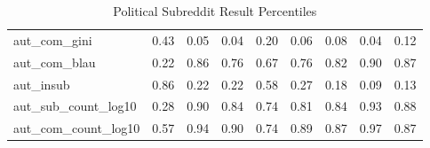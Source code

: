 \begin{table}
\begin{tabular}{lrrrrrrrr}
aut\_com\_gini        &        0.43 &         0.05 &          0.04 &      0.20 &          0.06 &       0.08 &                 0.04 &                 0.12 \\
aut\_com\_blau        &        0.22 &         0.86 &          0.76 &      0.67 &          0.76 &       0.82 &                 0.90 &                 0.87 \\
aut\_insub           &        0.86 &         0.22 &          0.22 &      0.58 &          0.27 &       0.18 &                 0.09 &                 0.13 \\
aut\_sub\_count\_log10 &        0.28 &         0.90 &          0.84 &      0.74 &          0.81 &       0.84 &                 0.93 &                 0.88 \\
aut\_com\_count\_log10 &        0.57 &         0.94 &          0.90 &      0.74 &          0.89 &       0.87 &                 0.97 &                 0.87 \\
\bottomrule
\end{tabular}
\caption{Political Subreddit Result Percentiles}
\label{table/pol:pct}
\end{table}